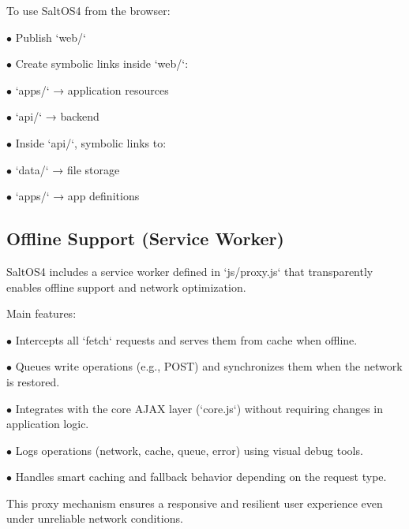 \documentclass[a4paper]{article}
\begin{document}
To use SaltOS4 from the browser:

\begin{compactitem}
\item[\color{myblue}$\bullet$] Publish `web/`
\item[\color{myblue}$\bullet$] Create symbolic links inside `web/`:
  \begin{compactitem}
  \item[\color{myblue}$\bullet$] `apps/` → application resources
  \item[\color{myblue}$\bullet$] `api/` → backend
  \end{compactitem}
\item[\color{myblue}$\bullet$] Inside `api/`, symbolic links to:
  \begin{compactitem}
  \item[\color{myblue}$\bullet$] `data/` → file storage
  \item[\color{myblue}$\bullet$] `apps/` → app definitions
  \end{compactitem}
\end{compactitem}

\hypertarget{toc20}{}
\subsection{Offline Support (Service Worker)}

SaltOS4 includes a service worker defined in `js/proxy.js` that transparently enables offline support and network optimization.

Main features:

\begin{compactitem}
\item[\color{myblue}$\bullet$] Intercepts all `fetch` requests and serves them from cache when offline.
\item[\color{myblue}$\bullet$] Queues write operations (e.g., POST) and synchronizes them when the network is restored.
\item[\color{myblue}$\bullet$] Integrates with the core AJAX layer (`core.js`) without requiring changes in application logic.
\item[\color{myblue}$\bullet$] Logs operations (network, cache, queue, error) using visual debug tools.
\item[\color{myblue}$\bullet$] Handles smart caching and fallback behavior depending on the request type.
\end{compactitem}

This proxy mechanism ensures a responsive and resilient user experience even under unreliable network conditions.
\end{document}
